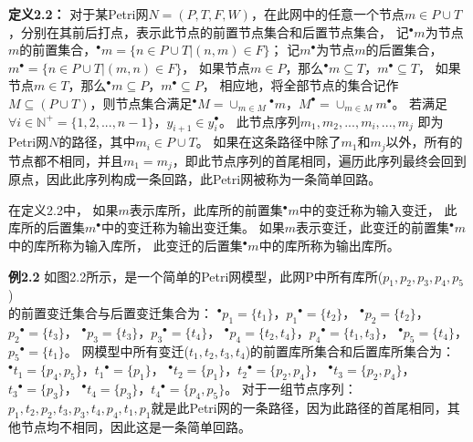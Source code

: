     \textbf{定义2.2}\cite{Liu2013}\textbf{：}
    对于某Petri网$N = (P, T, F, W)$，在此网中的任意一个节点$m \in P \cup T$，分别在其前后打点，表示此节点的前置节点集合和后置节点集合，
    记$^{\bullet}m$为节点$m$的前置集合，$^{\bullet} m = \{n \in P \cup T|(n, m) \in F\}$；
    记$m^{\bullet}$为节点$m$的后置集合，$m^{\bullet} = \{n \in P \cup T|(m, n) \in F\}$，
    如果节点$m \in P$，那么$^{\bullet}m \subseteq T$，$m^{\bullet} \subseteq T$，
    如果节点$m \in T$，那么$^{\bullet}m \subseteq P$，$m^{\bullet} \subseteq P$，
    相应地，将全部节点的集合记作$M \subseteq (P \cup T)$，则节点集合满足$^{\bullet}M = \cup _{m \in M} {^\bullet}m$，$M^{\bullet} = \cup_{m \in M} m^{\bullet}$。
    若满足$\forall i\in \mathbb{N}^+ = \{1, 2,...,n-1\}$，$y_{i+1} \in y_i^{\bullet}$。 此节点序列$m_{1}, m_{2},..., m_{i},...,m_{j}$ 即为Petri网$N$的路径，其中$m_{i} \in P \cup T$。
    如果在这条路径中除了$m_{1}$和$m_{j}$以外，所有的节点都不相同，并且$m_{1} = m_{j}$，即此节点序列的首尾相同，遍历此序列最终会回到原点，因此此序列构成一条回路，此Petri网被称为一条简单回路。
    
    在定义2.2中，
    如果$m$表示库所，此库所的前置集$^{\bullet} m$中的变迁称为输入变迁，
    此库所的后置集$m^{\bullet}$中的变迁称为输出变迁集。
    如果$m$表示变迁，此变迁的前置集$^{\bullet} m$中的库所称为输入库所，
    此变迁的后置集$^{\bullet} m$中的库所称为输出库所。

    \textbf{例2.2}\hspace{0.5em}
    如图2.2所示，是一个简单的Petri网模型，此网P中所有库所($p_{1},p_{2},p_{3},p_{4},p_{5}$) \\ 的前置变迁集合与后置变迁集合为：
    $^\bullet p_1 = \{t_1\}$，${p_1}^\bullet = \{t_2\}$，
    $^\bullet p_2 = \{t_2\}$，${p_2}^\bullet = \{t_3\}$，
    $^\bullet p_3 = \{t_3\}$，${p_3}^\bullet = \{t_4\}$，
    $^\bullet p_4 = \{t_2, t_4\}$，${p_4}^\bullet = \{t_1, t_3\}$，
    $^\bullet p_5 = \{t_4\}$，${p_5}^\bullet = \{t_1\}$。
    网模型中所有变迁($t_{1},t_{2},t_{3},t_{4}$)的前置库所集合和后置库所集合为：
    $^\bullet t_1 = \{p_4, p_5\}$，${t_1}^\bullet = \{p_1\}$，
    $^\bullet t_2 = \{p_1\}$，${t_2}^\bullet = \{p_2, p_4\}$，
    $^\bullet t_3 = \{p_2, p_4\}$，${t_3}^\bullet = \{p_3\}$，
    $^\bullet t_4 = \{p_3\}$，${t_4}^\bullet = \{p_4, p_5\}$。
    对于一组节点序列：$p_1, t_2, p_2, t_3, p_3, t_4, p_4, t_1, p_1$就是此Petri网的一条路径，因为此路径的首尾相同，其他节点均不相同，因此这是一条简单回路。
    
